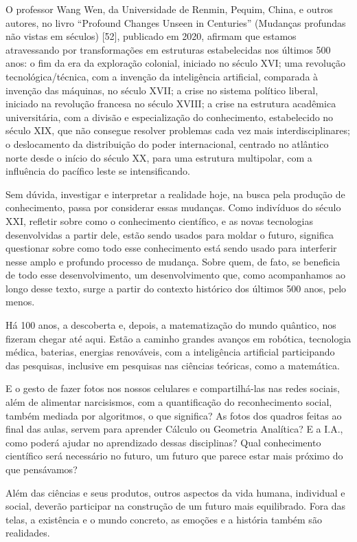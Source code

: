 \documentclass{hipatia}
\begin{document}
	O professor Wang Wen, da Universidade de Renmin, Pequim, China, e outros autores, no livro ``Profound Changes Unseen in Centuries'' (Mudanças profundas não vistas em séculos) [52], publicado em 2020, afirmam que estamos atravessando por transformações em estruturas estabelecidas nos últimos 500 anos: o fim da era da exploração colonial, iniciado no século XVI; uma revolução tecnológica/técnica, com a invenção da inteligência artificial, comparada à invenção das máquinas, no século XVII; a crise no sistema político liberal, iniciado na revolução francesa no século XVIII; a crise na estrutura acadêmica universitária, com a divisão e especialização do conhecimento, estabelecido no século XIX, que não consegue resolver problemas cada vez mais interdisciplinares; o deslocamento da distribuição do poder internacional, centrado no atlântico norte desde o início do século XX, para uma estrutura multipolar, com a influência do pacífico leste se intensificando.

	Sem dúvida, investigar e interpretar a realidade hoje, na busca pela produção de conhecimento, passa por considerar essas mudanças. Como indivíduos do século XXI, refletir sobre como o conhecimento científico, e as novas tecnologias desenvolvidas a partir dele, estão sendo usados para moldar o futuro, significa questionar sobre como todo esse conhecimento está sendo usado para interferir nesse amplo e profundo processo de mudança.  Sobre quem, de fato, se beneficia de todo esse desenvolvimento, um desenvolvimento que, como acompanhamos ao longo desse texto, surge a partir do contexto histórico dos últimos 500 anos, pelo menos. 

	Há 100 anos, a descoberta e, depois, a matematização do mundo quântico, nos fizeram chegar até aqui. Estão a caminho grandes avanços em robótica, tecnologia médica, baterias, energias renováveis, com a  inteligência artificial participando das pesquisas, inclusive em pesquisas nas ciências teóricas, como a matemática.

	E o gesto de fazer fotos nos nossos celulares e compartilhá-las nas redes sociais, além de alimentar narcisismos, com a quantificação do reconhecimento social, também mediada por algoritmos, o que significa? As fotos dos quadros feitas ao final das aulas, servem para aprender Cálculo ou Geometria Analítica? E a I.A., como poderá ajudar no aprendizado dessas disciplinas? Qual conhecimento científico será necessário no futuro, um futuro que parece estar mais próximo do que pensávamos?


	Além das ciências e seus produtos, outros aspectos da vida humana, individual e social, deverão participar na construção de um futuro mais equilibrado. Fora das telas, a existência e o mundo concreto, as emoções e a história também são realidades.
\end{document}
